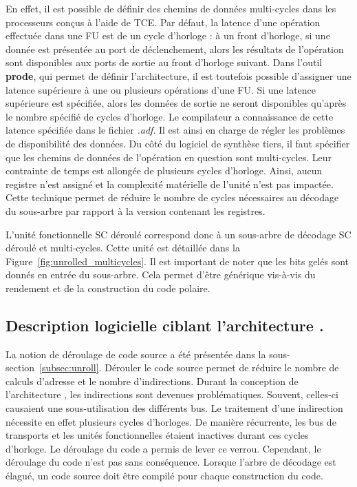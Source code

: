 En effet, il est possible de définir des chemins de données multi-cycles dans les processeurs conçus à l'aide de TCE. Par défaut, la latence d'une opération effectuée dans une FU est de un cycle d'horloge : à un front d'horloge, si une donnée est présentée au port de déclenchement, alors les résultats de l'opération sont disponibles aux ports de sortie au front d'horloge suivant. Dans l'outil \textbf{prode}, qui permet de définir l'architecture, il est toutefois possible d'assigner une latence supérieure à une ou plusieurs opérations d'une FU. Si une latence supérieure est spécifiée, alors les données de sortie ne seront disponibles qu'après le nombre spécifié de cycles d'horloge. Le compilateur a connaissance de cette latence spécifiée dans le fichier \textit{.adf}. Il est ainsi en charge de régler les problèmes de disponibilité des données. Du côté du logiciel de synthèse tiers, il faut spécifier que les chemins de données de l'opération en question sont multi-cycles. Leur contrainte de temps est allongée de plusieurs cycles d'horloge. Ainsi, aucun registre n'est assigné et la complexité matérielle de l'unité n'est pas impactée. Cette technique permet de réduire le nombre de cycles nécessaires au décodage du sous-arbre par rapport à la version contenant les registres.

L'unité fonctionnelle \og SC déroulé \fg correspond donc à un sous-arbre de décodage SC déroulé et multi-cycles. Cette unité est détaillée dans la Figure~\ref{fig:unrolled_multicycles}. Il est important de noter que les bits gelés sont donnés en entrée du sous-arbre. Cela permet d'être générique vis-à-vis du rendement et de la construction du code polaire.

\subsection{Description logicielle ciblant l'architecture \TTSC.}
\label{subsec:unroll_tta}

La notion de déroulage de code source a été présentée dans la sous-section~\ref{subsec:unroll}. Dérouler le code source permet de réduire le nombre de calculs d'adresse et le nombre d'indirections. Durant la conception de l'architecture \TTSC, les indirections sont devenues problématiques. Souvent, celles-ci causaient une sous-utilisation des différents bus. Le traitement d'une indirection nécessite en effet plusieurs cycles d'horloges. De manière récurrente, les bus de transports et les unités fonctionnelles étaient inactives durant ces cycles d'horloge. Le déroulage du code a permis de lever ce verrou. Cependant, le déroulage du code n'est pas sans conséquence. Lorsque l'arbre de décodage est élagué, un code source doit être compilé pour chaque construction du code.

